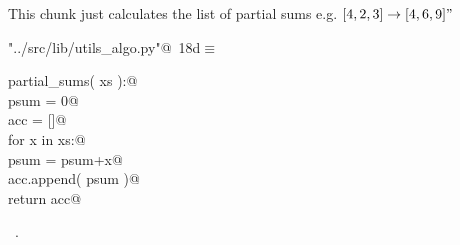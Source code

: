 \documentclass[11.5pt]{report}
\begin{document}
\vspace{-0.8cm}
\newchunk This chunk just calculates the list of partial sums e.g. $[4,2,3] \rightarrow [4,6,9]"$
\begin{flushleft} \small\label{scrap17}\raggedright\small
{} \verb@"../src/lib/utils_algo.py"@\nobreak\ {\footnotesize {18d}}$\equiv$
\vspace{-1ex}
\begin{list}{}{} \item
\mbox{}\verb@def partial_sums( xs ):@\\
\mbox{}\verb@    psum = 0@\\
\mbox{}\verb@    acc = []@\\
\mbox{}\verb@    for x in xs:@\\
\mbox{}\verb@        psum = psum+x@\\
\mbox{}\verb@        acc.append( psum )@\\
\mbox{}\verb@    return acc@\\
\mbox{}\verb@@{\NWsep}
\end{list}
\vspace{-1.5ex}
\footnotesize
\begin{list}{}{\setlength{\itemsep}{-\parsep}\setlength{\itemindent}{-\leftmargin}}
\item \NWtxtFileDefBy\ .

\item{}
\end{list}
\vspace{4ex}
\end{flushleft}
\end{document}
